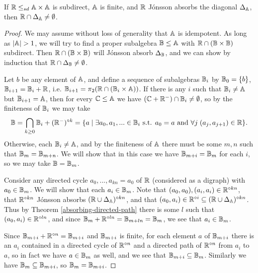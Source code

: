 \documentclass[letterpaper,11pt]{article}
\begin{document}
\begin{thm}\label{absorbing-diagonal} If $\mathbb{R} \le_{sd} \mathbb{A}\times \mathbb{A}$ is subdirect, $\mathbb{A}$ is finite, and $\mathbb{R}$ J\'onsson absorbs the diagonal $\Delta_{\mathbb{A}}$, then $\mathbb{R} \cap \Delta_{\mathbb{A}} \ne \emptyset$.
\end{thm}
\begin{proof} We may assume without loss of generality that $\mathbb{A}$ is idempotent. As long as $|\mathbb{A}| > 1$, we will try to find a proper subalgebra $\mathbb{B} \le \mathbb{A}$ with $\mathbb{R} \cap (\mathbb{B} \times \mathbb{B})$ subdirect. Then $\mathbb{R}\cap (\mathbb{B}\times \mathbb{B})$ will J\'onsson absorb $\Delta_{\mathbb{B}}$, and we can show by induction that $\mathbb{R} \cap \Delta_{\mathbb{B}} \ne \emptyset$.

Let $b$ be any element of $\mathbb{A}$, and define a sequence of subalgebras $\mathbb{B}_i$ by $\mathbb{B}_0 = \{b\}$, $\mathbb{B}_{i+1} = \mathbb{B}_i + \mathbb{R}$, i.e. $\mathbb{B}_{i+1} = \pi_2(\mathbb{R} \cap (\mathbb{B}_i \times \mathbb{A}))$. If there is any $i$ such that $\mathbb{B}_i \ne \mathbb{A}$ but $\mathbb{B}_{i+1} = \mathbb{A}$, then for every $\mathbb{C} \le \mathbb{A}$ we have $(\mathbb{C} + \mathbb{R}^-) \cap \mathbb{B}_i \ne \emptyset$, so by the finiteness of $\mathbb{B}_i$ we may take
\[
\mathbb{B} = \bigcap_{k \ge 0} \mathbb{B}_i+(\mathbb{R}^-)^{\circ k} = \{a \mid \exists a_0, a_1, ... \in \mathbb{B}_i \text{ s.t. } a_0 = a \text{ and } \forall j \; (a_j,a_{j+1}) \in \mathbb{R}\}.
\]
Otherwise, each $\mathbb{B}_i \ne \mathbb{A}$, and by the finiteness of $\mathbb{A}$ there must be some $m,n$ such that $\mathbb{B}_m = \mathbb{B}_{m+n}$. We will show that in this case we have $\mathbb{B}_{m+i} = \mathbb{B}_m$ for each $i$, so we may take $\mathbb{B} = \mathbb{B}_m$.

Consider any directed cycle $a_0, ..., a_{kn} = a_0$ of $\mathbb{R}$ (considered as a digraph) with $a_0 \in \mathbb{B}_m$. We will show that each $a_i \in \mathbb{B}_m$. Note that $(a_0,a_0), (a_i,a_i) \in \mathbb{R}^{\circ kn}$, that $\mathbb{R}^{\circ kn}$ J\'onsson absorbs $(\mathbb{R}\cup\Delta_{\mathbb{A}})^{\circ kn}$, and that $(a_0,a_i) \in \mathbb{R}^{\circ i} \subseteq (\mathbb{R}\cup\Delta_{\mathbb{A}})^{\circ kn}$. Thus by Theorem \ref{absorbing-directed-path} there is some $l$ such that $(a_0,a_i) \in \mathbb{R}^{\circ ln}$, and since $\mathbb{B}_m + \mathbb{R}^{\circ ln} = \mathbb{B}_{m+ln} = \mathbb{B}_m$, we see that $a_i \in \mathbb{B}_m$.

Since $\mathbb{B}_{m+i} + \mathbb{R}^{\circ n} = \mathbb{B}_{m+i}$ and $\mathbb{B}_{m+i}$ is finite, for each element $a$ of $\mathbb{B}_{m+i}$ there is an $a_i$ contained in a directed cycle of $\mathbb{R}^{\circ n}$ and a directed path of $\mathbb{R}^{\circ n}$ from $a_i$ to $a$, so in fact we have $a \in \mathbb{B}_m$ as well, and we see that $\mathbb{B}_{m+i} \subseteq \mathbb{B}_m$. Similarly we have $\mathbb{B}_m \subseteq \mathbb{B}_{m+i}$, so $\mathbb{B}_m = \mathbb{B}_{m+i}$.
\end{proof}
\end{document}

